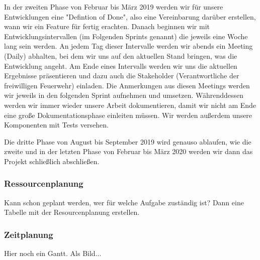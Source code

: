 In der zweiten Phase von Februar bis März 2019 werden wir für unsere Entwicklungen eine "Defintion of Done", also eine Vereinbarung darüber erstellen, wann wir ein Feature für fertig erachten. Danach beginnen wir mit Entwicklungsintervallen (im Folgenden Sprints genannt) die jeweils eine Woche lang sein werden. An jedem Tag dieser Intervalle werden wir abends ein Meeting (Daily) abhalten, bei dem wir uns auf den aktuellen Stand bringen, was die Entwicklung angeht. Am Ende eines Intervalls werden wir uns die aktuellen Ergebnisse präsentieren und dazu auch die Stakeholder (Verantwortliche der freiwilligen Feuerwehr) einladen. Die Anmerkungen aus diesen Meetings werden wir jeweils in den folgenden Sprint aufnehmen und umsetzen. 
Währenddessen werden wir immer wieder unsere Arbeit dokumentieren, damit wir nicht am Ende eine große Dokumentationsphase einleiten müssen. Wir werden außerdem unsere Komponenten mit Tests versehen.

Die dritte Phase von August bis September 2019 wird genauso ablaufen, wie die zweite und in der letzten Phase von Februar bis März 2020 werden wir dann das Projekt schließlich abschließen.  

\subsubsection{Ressourcenplanung}

Kann schon geplant werden, wer für welche Aufgabe zuständig ist? Dann eine Tabelle mit der Resourcenplanung erstellen.


\subsubsection{Zeitplanung}

Hier noch ein Gantt. Als Bild...